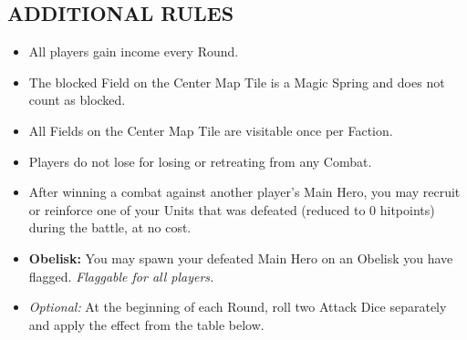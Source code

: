 \begin{multicols*}{2}
\subsection*{\MakeUppercase{Additional Rules}}
\begin{itemize}
  \item All players gain income every Round.
  \item The blocked Field on the Center Map Tile is a Magic Spring and does not count as blocked.
  \item All Fields on the Center Map Tile are visitable once per Faction.
  \item Players do not lose  for losing or retreating from any Combat.
  \item After winning a combat against another player’s Main Hero, you may recruit or reinforce one of your Units that was defeated (reduced to 0 hitpoints) during the battle, at no cost.
  \item \textbf{Obelisk:} You may spawn your defeated Main Hero on an Obelisk you have flagged. \textit{Flaggable for all players.}
  \item \textit{Optional:} At the beginning of each Round, roll two Attack Dice separately and apply the effect from the table below.
\end{itemize}

\vspace*{\fill}
\end{multicols*}
